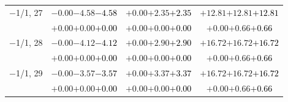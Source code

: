 \documentclass[compress]{beamer}
\begin{document}
\begin{frame}
\begin{tabular}{r | c | c | c}
$-$1/1, 27 & $-0.00$\hspace{0.1 cm}$-4.58$\hspace{0.1 cm}\textcolor{black}{$-4.58$} & $+0.00$\hspace{0.1 cm}$+2.35$\hspace{0.1 cm}\textcolor{black}{$+2.35$} & $+12.81$\hspace{0.1 cm}$+12.81$\hspace{0.1 cm}\textcolor{black}{$+12.81$} \\
           & $+0.00$\hspace{0.1 cm}$+0.00$\hspace{0.1 cm}\textcolor{black}{$+0.00$} & $+0.00$\hspace{0.1 cm}$+0.00$\hspace{0.1 cm}\textcolor{black}{$+0.00$} & $+0.00$\hspace{0.1 cm}$+0.66$\hspace{0.1 cm}\textcolor{black}{$+0.66$} \\
$-$1/1, 28 & $-0.00$\hspace{0.1 cm}$-4.12$\hspace{0.1 cm}\textcolor{black}{$-4.12$} & $+0.00$\hspace{0.1 cm}$+2.90$\hspace{0.1 cm}\textcolor{black}{$+2.90$} & $+16.72$\hspace{0.1 cm}$+16.72$\hspace{0.1 cm}\textcolor{black}{$+16.72$} \\
           & $+0.00$\hspace{0.1 cm}$+0.00$\hspace{0.1 cm}\textcolor{black}{$+0.00$} & $+0.00$\hspace{0.1 cm}$+0.00$\hspace{0.1 cm}\textcolor{black}{$+0.00$} & $+0.00$\hspace{0.1 cm}$+0.66$\hspace{0.1 cm}\textcolor{black}{$+0.66$} \\
$-$1/1, 29 & $-0.00$\hspace{0.1 cm}$-3.57$\hspace{0.1 cm}\textcolor{black}{$-3.57$} & $+0.00$\hspace{0.1 cm}$+3.37$\hspace{0.1 cm}\textcolor{black}{$+3.37$} & $+16.72$\hspace{0.1 cm}$+16.72$\hspace{0.1 cm}\textcolor{black}{$+16.72$} \\
           & $+0.00$\hspace{0.1 cm}$+0.00$\hspace{0.1 cm}\textcolor{black}{$+0.00$} & $+0.00$\hspace{0.1 cm}$+0.00$\hspace{0.1 cm}\textcolor{black}{$+0.00$} & $+0.00$\hspace{0.1 cm}$+0.66$\hspace{0.1 cm}\textcolor{black}{$+0.66$} \\

\end{tabular}
\end{frame}
\end{document}

